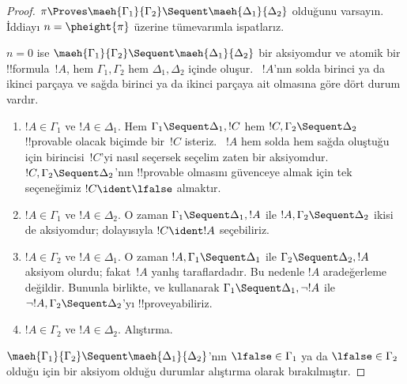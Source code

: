 \begin{proof}
  $\pi \Proves \maeh{\Gamma_1}{\Gamma_2} \Sequent
  \maeh{\Delta_1}{\Delta_2}$ olduğunu varsayın. İddiayı
  $n=\pheight{\pi}$ üzerine tümevarımla ispatlarız.

  $n=0$ ise $\maeh{\Gamma_1}{\Gamma_2} \Sequent
  \maeh{\Delta_1}{\Delta_2}$ bir aksiyomdur ve atomik bir
  !!{formula}~$!A$, hem $\Gamma_1, \Gamma_2$ hem $\Delta_1, \Delta_2$ içinde
  oluşur. ~$!A$'nın solda birinci ya da ikinci parçaya ve sağda birinci ya
  da ikinci parçaya ait olmasına göre dört durum vardır.
  \begin{enumerate}
    \item $!A \in \Gamma_1$ ve $!A \in \Delta_1$. Hem $\Gamma_1 \Sequent
    \Delta_1, !C$ hem $!C, \Gamma_2 \Sequent \Delta_2$ !!{provable} olacak
    biçimde bir~$!C$ isteriz. ~$!A$ hem solda hem sağda oluştuğu için
    birincisi~$!C$'yi nasıl seçersek seçelim zaten bir aksiyomdur. $!C,
    \Gamma_2 \Sequent \Delta_2$'nın !!{provable} olmasını güvenceye almak
    için tek seçeneğimiz $!C \ident \lfalse$ almaktır.
    \item $!A \in \Gamma_1$ ve $!A \in \Delta_2$. O zaman $\Gamma_1
    \Sequent \Delta_1, !A$ ile $!A, \Gamma_2 \Sequent \Delta_2$ ikisi de
    aksiyomdur; dolayısıyla $!C \ident !A$ seçebiliriz.
    \item $!A \in \Gamma_2$ ve $!A \in \Delta_1$. O zaman $!A, \Gamma_1
    \Sequent \Delta_1$ ile $\Gamma_2 \Sequent \Delta_2, !A$ aksiyom
    olurdu; fakat~$!A$ yanlış taraflardadır. Bu nedenle $!A$ aradeğerleme
    değildir. Bununla birlikte, \RightR{\lnot} ve \LeftR{\lnot} kullanarak
    $\Gamma_1 \Sequent \Delta_1, \lnot!A$ ile $\lnot !A, \Gamma_2 \Sequent
    \Delta_2$'yı !!{prove}{}yabiliriz.
    \item $!A \in \Gamma_2$ ve $!A \in \Delta_2$. Alıştırma.
  \end{enumerate}
  $\maeh{\Gamma_1}{\Gamma_2} \Sequent \maeh{\Delta_1}{\Delta_2}$'nın
  $\lfalse \in \Gamma_1$ ya da $\lfalse \in \Gamma_2$ olduğu için bir
  aksiyom olduğu durumlar alıştırma olarak bırakılmıştır.


\end{proof}
